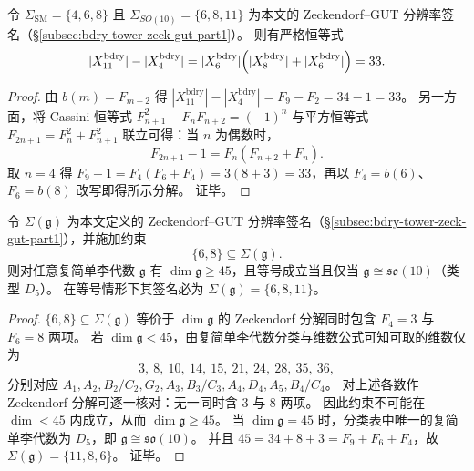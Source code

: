 \begin{proposition}\label{prop:bdry-gap-33-cassini-factorization}
令 \(\Sigma_{\mathrm{SM}}=\{4,6,8\}\) 且 \(\Sigma_{SO(10)}=\{6,8,11\}\) 为本文的 Zeckendorf--GUT 分辨率签名（\S\ref{subsec:bdry-tower-zeck-gut-part1}）。
则有严格恒等式
\[
|X_{11}^{\mathrm{bdry}}|-|X_{4}^{\mathrm{bdry}}|
=
|X_{6}^{\mathrm{bdry}}|\Bigl(|X_{8}^{\mathrm{bdry}}|+|X_{6}^{\mathrm{bdry}}|\Bigr)
=33.
\]
\end{proposition}
\begin{proof}
由 \(b(m)=F_{m-2}\) 得 \(|X_{11}^{\mathrm{bdry}}|-|X_{4}^{\mathrm{bdry}}|=F_9-F_2=34-1=33\)。
另一方面，将 Cassini 恒等式 \(F_{n+1}^2-F_nF_{n+2}=(-1)^n\) 与平方恒等式 \(F_{2n+1}=F_n^2+F_{n+1}^2\) 联立可得：当 \(n\) 为偶数时，
\[
F_{2n+1}-1=F_n(F_{n+2}+F_n).
\]
取 \(n=4\) 得 \(F_9-1=F_4(F_6+F_4)=3(8+3)=33\)，再以 \(F_4=b(6)\)、\(F_6=b(8)\) 改写即得所示分解。
证毕。
\end{proof}

\begin{theorem}\label{thm:nap-so10-analytic-minimality}
令 \(\Sigma(\mathfrak g)\) 为本文定义的 Zeckendorf--GUT 分辨率签名（\S\ref{subsec:bdry-tower-zeck-gut-part1}），并施加约束
\[
\{6,8\}\subseteq \Sigma(\mathfrak g).
\]
则对任意复简单李代数 \(\mathfrak g\) 有 \(\dim\mathfrak g\ge 45\)，且等号成立当且仅当 \(\mathfrak g\cong \mathfrak{so}(10)\)（类型 \(D_5\)）。
在等号情形下其签名必为 \(\Sigma(\mathfrak g)=\{6,8,11\}\)。
\end{theorem}
\begin{proof}
\(\{6,8\}\subseteq\Sigma(\mathfrak g)\) 等价于 \(\dim\mathfrak g\) 的 Zeckendorf 分解同时包含 \(F_4=3\) 与 \(F_6=8\) 两项。
若 \(\dim\mathfrak g<45\)，由复简单李代数分类与维数公式可知可取的维数仅为
\[
3,\ 8,\ 10,\ 14,\ 15,\ 21,\ 24,\ 28,\ 35,\ 36,
\]
分别对应 \(A_1,A_2,B_2/C_2,G_2,A_3,B_3/C_3,A_4,D_4,A_5,B_4/C_4\)。
对上述各数作 Zeckendorf 分解可逐一核对：无一同时含 \(3\) 与 \(8\) 两项。
因此约束不可能在 \(\dim<45\) 内成立，从而 \(\dim\mathfrak g\ge 45\)。
当 \(\dim\mathfrak g=45\) 时，分类表中唯一的复简单李代数为 \(D_5\)，即 \(\mathfrak g\cong\mathfrak{so}(10)\)。
并且 \(45=34+8+3=F_9+F_6+F_4\)，故 \(\Sigma(\mathfrak g)=\{11,8,6\}\)。
证毕。
\end{proof}
